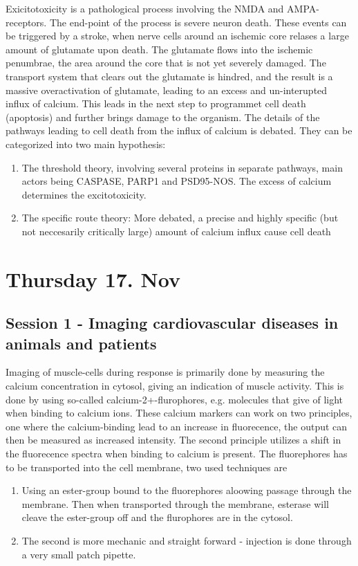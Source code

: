 \documentclass[12p]{article}
\begin{document}
Exicitotoxicity is a pathological process involving the NMDA and AMPA-receptors.
The end-point of the process is severe neuron death.
These events can be triggered by a stroke, when nerve cells around an ischemic core relases a large amount of glutamate upon death.
The glutamate flows into the ischemic penumbrae, the area around the core that is not yet severely damaged.
The transport system that clears out the glutamate is hindred, and the result is a massive overactivation of glutamate, leading to an excess and un-interupted influx of calcium.
This leads in the next step to programmet cell death (apoptosis) and further brings damage to the organism.
The details of the pathways leading to cell death from the influx of calcium is debated.
They can be categorized into two main hypothesis:

\begin{enumerate}
\item
The threshold theory, involving several proteins in separate pathways, main actors being CASPASE, PARP1 and PSD95-NOS. The excess of calcium determines the excitotoxicity.
\item
The specific route theory: More debated, a precise and highly specific (but not neccesarily critically large) amount of calcium influx cause cell death
\end{enumerate}

\section*{Thursday 17. Nov}

\subsection*{Session 1 - Imaging cardiovascular diseases in animals and patients}

Imaging of muscle-cells during response is primarily done by measuring the calcium concentration in cytosol, giving an indication of muscle activity.
This is done by using so-called calcium-2+-flurophores, e.g. molecules that give of light when binding to calcium ions.
These calcium markers can work on two principles, one where the calcium-binding lead to an increase in fluorecence, the output can then be measured as increased intensity.
The second principle utilizes a shift in the fluorecence spectra when binding to calcium is present.
The fluorephores has to be transported into the cell membrane, two used techniques are 

\begin{enumerate}
\item
Using an ester-group bound to the fluorephores aloowing passage through the membrane.
Then when transported through the membrane, esterase will cleave the ester-group off and the flurophores are in the cytosol.
\item
The second is more mechanic and straight forward - injection is done through a very small patch pipette.
\end{enumerate}
\end{document}
